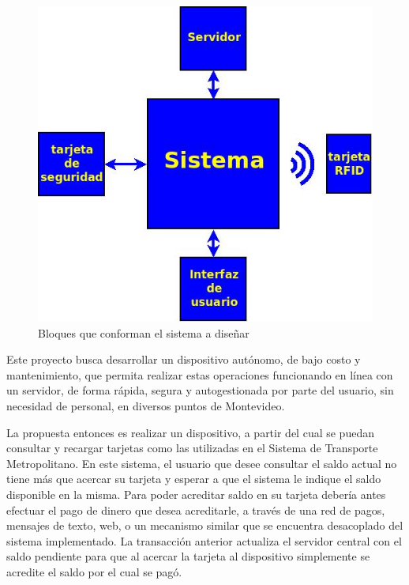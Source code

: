 \begin{figure}[H]
\centering
  \begin{center}
  \includegraphics[scale=.4]{Imagenes/diagrama_def.jpg} 
  \end{center}
  \caption{Bloques que conforman el sistema a diseñar}\label{HW_gral} 
\end{figure}

Este proyecto busca desarrollar un dispositivo autónomo, de bajo costo y mantenimiento, que permita realizar estas operaciones funcionando en línea con un servidor, de forma rápida, segura y autogestionada por parte del usuario, sin necesidad de personal, en diversos puntos de Montevideo. 

\bigskip
La propuesta entonces es realizar un dispositivo, a partir del cual se puedan consultar y recargar tarjetas como las utilizadas en el Sistema de Transporte Metropolitano. En este sistema, el usuario que desee consultar el saldo actual no tiene más que acercar su tarjeta y esperar a que el sistema le indique el saldo disponible en la misma. Para poder acreditar saldo en su tarjeta debería antes efectuar el pago de dinero que desea acreditarle, a través de una red de pagos, mensajes de texto, web, o un mecanismo similar que se encuentra desacoplado del sistema implementado. La transacción anterior actualiza el servidor central con el saldo pendiente para que al acercar la tarjeta al dispositivo simplemente se acredite el saldo por el cual se pagó.


